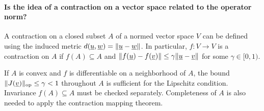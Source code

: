 \documentclass[10pt,english]{article}
\begin{document}
\paragraph{Is the idea of a contraction on a vector space related to the operator norm?}

A contraction on a closed subset $A$ of a normed vector space $V$ can be defined using the induced metric $d(\underline{u},\underline{w}) = \| \underline{u} - \underline{w} \|$.
In particular, $f \colon V \to V$ is a contraction on $A$ if $f(A) \subseteq A$ and $\| f(\underline{u}) - f(\underline{v}) \| \leq \gamma \| \underline{u} - \underline{v} \|$ for some $\gamma \in [0,1)$.

If $A$ is convex and $f$ is differentiable on a neighborhood of $A$, the bound $\|J(\underline{v})\|_{\mathrm{op}}\leq\gamma<1$ throughout $A$ is sufficient for the Lipschitz condition. Invariance $f(A)\subseteq A$ must be checked separately. Completeness of $A$ is also needed to apply the contraction mapping theorem.
\end{document}
